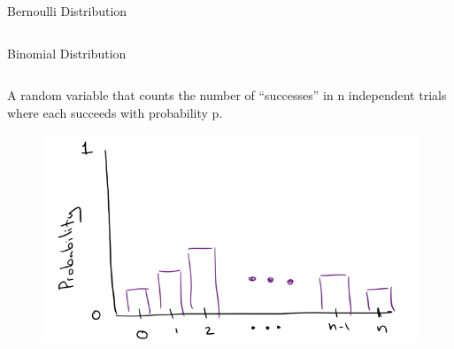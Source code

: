 \documentclass[aspectratio=169]{../latex_main/tntbeamer}  %
\begin{document}
\begin{frame}[c]{Bernoulli Distribution}
\begin{columns}
\begin{column}{.5\textwidth}
	        \end{column}
	    \end{columns}
	\end{frame}
	
	
	\begin{frame}[c]{Binomial Distribution}
	    \begin{columns}
	        \begin{column}{.4\textwidth}
	             A random variable that counts the number of “successes” in n independent trials where each succeeds with probability p.\\
	             \begin{figure}
	                 \centering
	                 \includegraphics[scale=.5]{Bild19}
	             \end{figure}
	        \end{column}
	        

\end{columns}
\end{frame}
\end{document}
